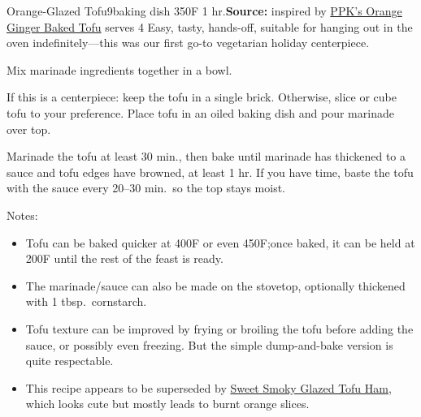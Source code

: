 \begin{recipe}{Orange-Glazed Tofu}{9\inch{}\inch baking dish \hfill 350\0F \hfill 1 hr.}{\textbf{Source:} inspired by \href{https://web.archive.org/web/20101121022851/https://www.theppk.com/2010/04/orange-ginger-baked-tofu/}{PPK's Orange Ginger Baked Tofu} \hfill serves 4}
 \freeform Easy, tasty, hands-off, suitable for hanging out in the oven indefinitely---this was our first go-to vegetarian holiday centerpiece.

 Mix marinade ingredients together in a bowl.

 If this is a centerpiece: keep the tofu in a single brick. Otherwise, slice or cube tofu to your preference. Place tofu in an oiled baking dish and pour marinade over top.

 \newstep Marinade the tofu at least 30 min., then bake until marinade has thickened to a sauce and tofu edges have browned, at least 1 hr. If you have time, baste the tofu with the sauce every 20--30 min.\ so the top stays moist.

 \freeform Notes:
 \begin{itemize}
  \item Tofu can be baked quicker at 400\0F or even 450\0F;\@ once baked, it can be held at 200\0F until the rest of the feast is ready.
  \item The marinade/sauce can also be made on the stovetop, optionally thickened with 1 tbsp.\ cornstarch.
  \item Tofu texture can be improved by frying or broiling the tofu before adding the sauce, or possibly even freezing. But the simple dump-and-bake version is quite respectable.
  \item This recipe appears to be superseded by \href{https://www.theppk.com/2016/12/sweet-smoky-glazed-tofu-ham/}{Sweet \And Smoky Glazed Tofu Ham}, which looks cute but mostly leads to burnt orange slices.
 \end{itemize}
\end{recipe}
